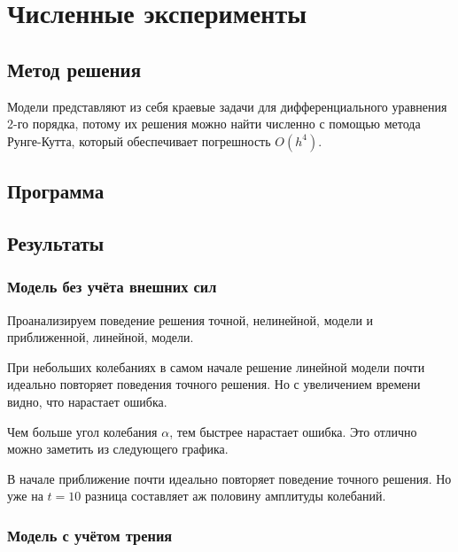 \pagebreak

\section{Численные эксперименты}

	\subsection{Метод решения}
		Модели представляют из себя краевые задачи для дифференциального уравнения 2-го порядка, потому их решения можно найти численно с помощью метода Рунге-Кутта, который обеспечивает погрешность \( O(h^4) \).

	\subsection{Программа}
		

	\subsection{Результаты}
		\subsubsection{Модель без учёта внешних сил}

			Проанализируем поведение решения точной, нелинейной, модели и приближенной, линейной, модели. 


			При небольших колебаниях в самом начале решение линейной модели почти идеально повторяет поведения точного решения. Но с увеличением времени видно, что нарастает ошибка.

			Чем больше угол колебания \( \alpha \), тем быстрее нарастает ошибка. Это отлично можно заметить из следующего графика.


			В начале приближение почти идеально повторяет поведение точного решения. Но уже на \( t = 10 \) разница составляет аж половину амплитуды колебаний.

		\subsubsection{Модель с учётом трения}

